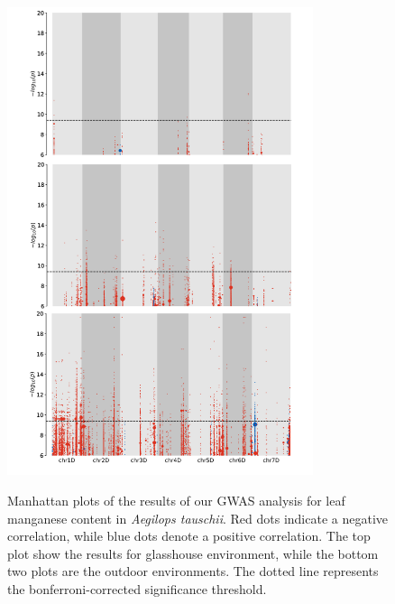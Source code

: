 \documentclass[12pt, letterpaper, ]{report}
\begin{document}
\begin{figure}[h]
        \centering
        \includegraphics[width = 0.8\textwidth]{images/gwas_plots/svgtopng/mn_manhattan_plot.png}
        \label{Fig:mn_peak_plot}
        \caption{Manhattan plots of the results of our GWAS analysis for leaf manganese content in \textit{Aegilops tauschii}. Red dots indicate a negative correlation, while blue dots denote a positive correlation. The top plot show the results for glasshouse environment, while the bottom two plots are the outdoor environments. The dotted line represents the bonferroni-corrected significance threshold.}
\end{figure}
        
\end{document}
